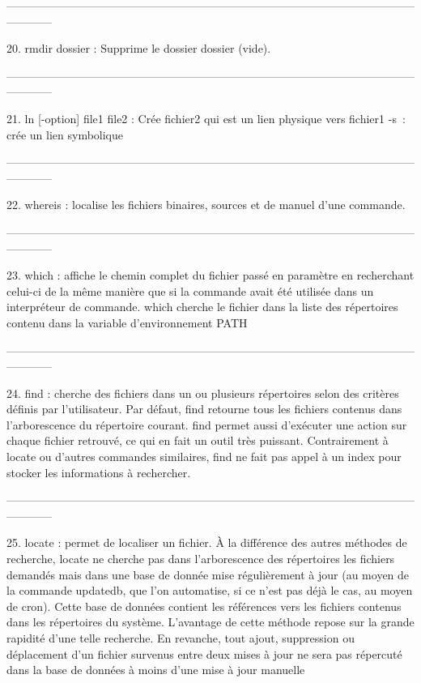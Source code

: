 \documentclass[a4paper, 10pt, onecolumn, openright, oneside]{book}
\begin{document}
------------------------------------------------------------------------------------------------------------------------

    20. rmdir dossier : Supprime le dossier dossier (vide). 

------------------------------------------------------------------------------------------------------------------------

    21. ln [-option] file1 file2 : Crée fichier2 qui est un lien physique vers fichier1
-s : crée un lien symbolique

------------------------------------------------------------------------------------------------------------------------

    22. whereis : localise les fichiers binaires, sources et de manuel d'une commande. 

------------------------------------------------------------------------------------------------------------------------

    23. which : affiche le chemin complet du fichier passé en paramètre en recherchant celui-ci de la même manière que si la commande avait été utilisée dans un interpréteur de commande. which cherche le fichier dans la liste des répertoires contenu dans la variable d'environnement PATH

------------------------------------------------------------------------------------------------------------------------

    24. find : cherche des fichiers dans un ou plusieurs répertoires selon des critères définis par l'utilisateur. 
Par défaut, find retourne tous les fichiers contenus dans l'arborescence du répertoire courant. find permet aussi d'exécuter une action sur chaque fichier retrouvé, ce qui en fait un outil très puissant. Contrairement à locate ou d'autres commandes similaires, find ne fait pas appel à un index pour stocker les informations à rechercher. 

------------------------------------------------------------------------------------------------------------------------

    25. locate : permet de localiser un fichier. À la différence des autres méthodes de recherche, locate ne cherche pas dans l'arborescence des répertoires les fichiers demandés mais dans une base de donnée mise régulièrement à jour (au moyen de la commande updatedb, que l'on automatise, si ce n'est pas déjà le cas, au moyen de cron). Cette base de données contient les références vers les fichiers contenus dans les répertoires du système. 
L'avantage de cette méthode repose sur la grande rapidité d'une telle recherche. En revanche, tout ajout, suppression ou déplacement d'un fichier survenus entre deux mises à jour ne sera pas répercuté dans la base de données à moins d'une mise à jour manuelle
\end{document}

